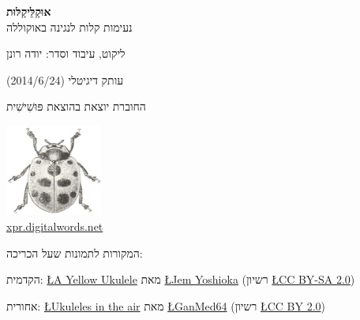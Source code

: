 \begin{center}
	\textbf{אוּקַלֵּיקַלּוּת}\\
	נעימות קלות לנגינה באוקוללה

	ליקוט, עיבוד וסדר: יודה רונן

	\vfill

	עותק דיגיטלי (2014/6/24)

	\vfill

	החוברת יוצאת בהוצאת פּוּשִׁישִׁית

	\includegraphics[height=3cm]{"puŝiŝit.png"}\\
	\url{xpr.digitalwords.net}

	\vfill

	המקורות לתמונות שעל הכריכה:


	הקדמית: \href{https://www.flickr.com/photos/jemshed/6423813619/}{\L{A Yellow Ukulele}} מאת \href{https://www.flickr.com/photos/jemshed/}{\L{Jem Yoshioka}} (רשיון \href{https://creativecommons.org/licenses/by-sa/2.0/}{\L{CC BY-SA 2.0}})

	אחורית: \href{https://www.flickr.com/photos/ganmed64/3645911185/}{\L{Ukuleles in the air}} מאת \href{https://www.flickr.com/photos/ganmed64/}{\L{GanMed64}} (רשיון \href{https://creativecommons.org/licenses/by/2.0/}{\L{CC BY 2.0}})
\end{center}
